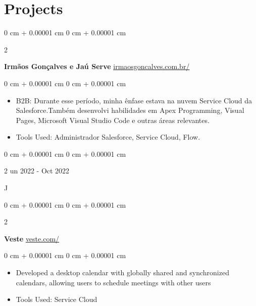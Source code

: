 \documentclass[10pt, letterpaper]{article}
\newenvironment{highlights}{
    \begin{itemize}[
        topsep=0.10 cm,
        parsep=0.10 cm,
        partopsep=0pt,
        itemsep=0pt,
        leftmargin=0 cm + 10pt
    ]
}{
    \end{itemize}
} %
\newenvironment{onecolentry}{
    \begin{adjustwidth}{
        0 cm + 0.00001 cm
    }{
        0 cm + 0.00001 cm
    }
}{
    \end{adjustwidth}
} %
\newenvironment{twocolentry}[2][]{
    \onecolentry
    \def\secondColumn{#2}
    \setcolumnwidth{\fill, 4.5 cm}
    \begin{paracol}{2}
}{
    \switchcolumn \raggedleft \secondColumn
    \end{paracol}
    \endonecolentry
} %
\begin{document}
    


    
    \section{Projects}



        
        \begin{twocolentry}{
            \href{https://www.irmaosgoncalves.com.br/}{irmaosgoncalves.com.br/}
        }
        
            \textbf{Irmãos Gonçalves e Jaú Serve}\end{twocolentry}

        \vspace{0.10 cm}
        \begin{onecolentry}
            \begin{highlights}
                \item B2B: Durante esse período, minha ênfase estava na nuvem Service Cloud da Salesforce.Também desenvolvi habilidades em Apex Programming, Visual Pages, Microsoft Visual Studio Code e outras áreas relevantes.
                \item Tools Used: Administrador Salesforce, Service Cloud, Flow. 
            \end{highlights}
        \end{onecolentry}
        


        \vspace{0.2 cm}

        \begin{twocolentry}
            Jun 2022 - Oct 2022
        \end{twocolentry}
        

        \begin{twocolentry}{
            \href{veste.com}{veste.com/}
        }
            \textbf{Veste}\end{twocolentry}

        \vspace{0.10 cm}
        \begin{onecolentry}
            \begin{highlights}
                \item Developed a desktop calendar with globally shared and synchronized calendars, allowing users to schedule meetings with other users
                \item Tools Used: Service Cloud
            \end{highlights}
        \end{onecolentry}
\end{document}
